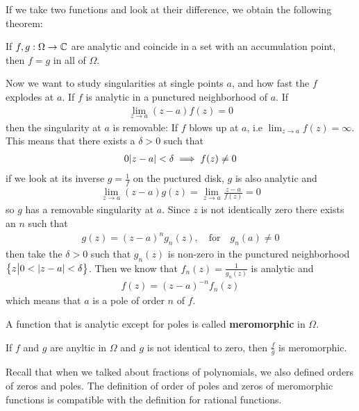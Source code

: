 If we take two functions and look at their difference, we obtain the following theorem:
\begin{theorem}[]
If $f,g: \Omega \to \mathbb{C}$ are analytic and coincide in a set with an accumulation point, then $f = g$ in all of $\Omega$.
\end{theorem}

Now we want to study singularities at single points $a$, and how fast the $f$ explodes at $a$. If $f$ is analytic in a punctured neighborhood of $a$. If
\begin{align*}
	\lim_{z \to a} (z-a)f(z) = 0
\end{align*}
then the singularity at $a$ is removable: If $f$ blows up at $a$, i.e $\lim_{z \to a}f(z) = \infty$. This means that there exists a $\delta > 0$ such that
\begin{align*}
	0 \vert z-a\vert < \delta \implies f(z) \neq 0
\end{align*}
if we look at its inverse $g = \frac{1}{f}$ on the puctured disk, $g$ is also analytic and
\begin{align*}
	\lim_{z \to a} (z-a) g(z) = \lim_{z \to a}\frac{z-a}{f(z)} = 0
\end{align*}
so $g$ has a removable singularity at $a$. Since $z$ is not identically zero there exists an $n$ such that
\begin{align*}
	g(z) = (z-a)^{n} g_n(z), \quad \text{for} \quad g_n(a) \neq 0
\end{align*}
then take the $\delta > 0$ such that $g_n(z)$ is non-zero in the punctured neighborhood $\left\{z \big\vert 0 <\vert z-a\vert < \delta\right\}$. Then we know that $f_n(z) = \frac{1}{g_n(z)}$ is analytic and
\begin{align*}
	f(z) = (z-a)^{-n}f_n(z)
\end{align*}
which means that $a$ is a pole of order $n$ of $f$.

 
\begin{definition}
A function that is analytic except for poles is called \textbf{meromorphic} in $\Omega$.
\end{definition}
If $f$ and $g$ are anyltic in $\Omega$ and $g$ is not identical to zero, then $\frac{f}{g}$ is meromorphic.

Recall that when we talked about fractions of polynomials, we also defined orders of zeros and poles. The definition of order of poles and zeros of meromorphic functions is compatible with the definition for rational functions.

